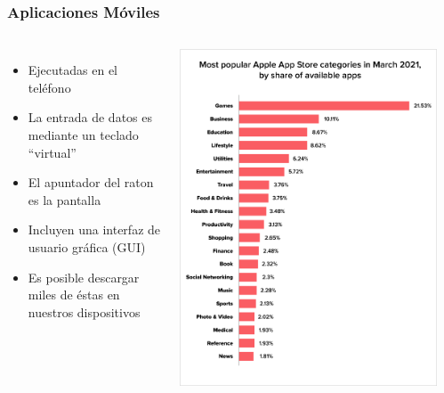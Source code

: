 \begin{frame}
\frametitle{Aplicaciones Móviles}  
\begin{columns}
\begin{itemize}
\item Ejecutadas en el tel\'efono
\item La entrada de datos es mediante un teclado ``virtual''
\item El apuntador del raton es la pantalla 
\item Incluyen una interfaz de usuario gr\'afica (GUI) 
\item Es posible descargar miles de \'estas en nuestros dispositivos
\end{itemize}
\begin{center}
\includegraphics[width=0.95\linewidth]{00_IntroProgramacionYMoviles/TiposAplicaciones.png} 
\end{center}
\begin{center}

\end{center}
\end{columns}
\end{frame}
